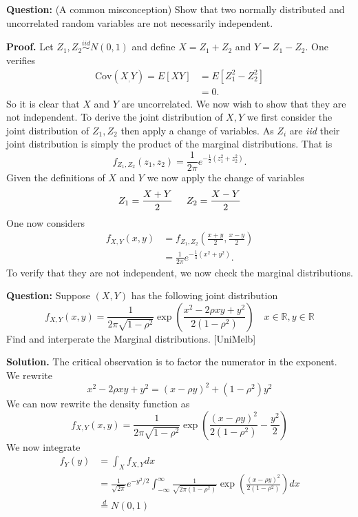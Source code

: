 \documentclass{article}
\begin{document}
\begin{tcolorbox}[colframe=black,colback=gray!5,boxrule=0.5pt]
\textbf{Question:} (A common misconception) Show that two normally distributed and uncorrelated random variables are not necessarily independent. 
\end{tcolorbox}
\textbf{Proof.} Let $Z_1,Z_2\stackrel{iid}{\sim}N(0,1)$ and define $X = Z_1 + Z_2$ and  $Y = Z_1 - Z_2$. One verifies 
\begin{align*}
    \text{Cov}(X_, Y) = E[XY] &= E[Z_1^2 -Z_2^2] \\
    &= 0.
\end{align*}
So it is clear that $X$ and $Y$ are uncorrelated. We now wish to show that they are not independent. To derive the joint distribution of $X,Y$ we first consider the joint distribution of $Z_1, Z_2$ then apply a change of variables. As $Z_i$ are \textit{iid} their joint distribution is simply the product of the marginal distributions. That is
$$f_{Z_1, Z_2}(z_1, z_2) = \frac{1}{2\pi}e^{-\frac{1}{2}(z_1^2 + z_2^2)}.$$
Given the definitions of $X$ and $Y$ we now apply the change of variables 
$$Z_1 = \frac{X+Y}{2} \hspace{5mm} Z_2 = \frac{X-Y}{2}$$
One now considers 
\begin{align*}
    f_{X,Y}(x, y) &= f_{Z_1, Z_2}\left(\frac{x+y}{2}, \frac{x-y}{2}\right) \\
    &= \frac{1}{2\pi}e^{-\frac{1}{4}(x^2 + y^2)}.
\end{align*}
To verify that they are not independent, we now check the marginal distributions. 


\begin{tcolorbox}[colframe=black,colback=gray!5,boxrule=0.5pt]
\textbf{Question:} Suppose $(X,Y)$ has the following joint distribution
$$f_{X,Y}(x,y) = \frac{1}{2\pi\sqrt{1-\rho^2}}\exp\left(\frac{x^2 - 2\rho xy + y^2}{2(1-\rho^2)}\right)\quad x\in\mathbb{R},y\in\mathbb{R}$$
Find and interperate the Marginal distributions. [UniMelb]
\end{tcolorbox}
\textbf{Solution.} The critical observation is to factor the numerator in the exponent. We rewrite $$x^2 -2\rho xy + y^2 = (x-\rho y)^2 + (1-\rho^2)y^2$$
We can now rewrite the density function as
$$f_{X,Y}(x,y) = \frac{1}{2\pi\sqrt{1-\rho^2}}\exp\left(\frac{(x-\rho y)^2}{2(1-\rho^2)} - \frac{y^2}{2}\right)$$
We now integrate
\begin{align*}
    f_Y(y) &= \int_{X} f_{X,Y}dx \\
    &= \frac{1}{\sqrt{2\pi}}e^{-y^2/2}\int_{-\infty}^{\infty} \frac{1}{\sqrt{2\pi(1-\rho^2)}}\exp\left(\frac{(x-\rho y)^2}{2(1-\rho^2)}\right)dx \\
    &\stackrel{d}{=} N(0,1)
\end{align*} 
\end{document}
